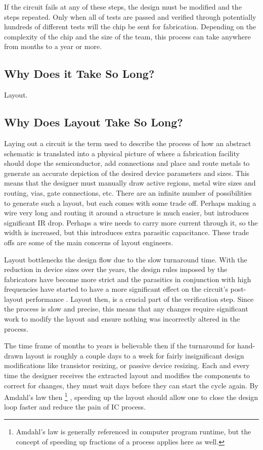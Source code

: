 
If the circuit fails at any of these steps, the design must be modified and the steps repeated. Only when all of tests are passed and verified through potentially hundreds of different tests will the chip be sent for fabrication. Depending on the complexity of the chip and the size of the team, this process can take anywhere from months to a year or more.
\subsection{Why Does it Take So Long?}
Layout.

\subsection{Why Does Layout Take So Long?}
Laying out a circuit is the term used to describe the process of how an abstract schematic is translated into a physical picture of where a fabrication facility should dope the semiconductor, add connections and place and route metals to generate an accurate depiction of the desired device parameters and sizes. This means that the designer must manually draw active regions, metal wire sizes and routing, vias, gate connections, etc. There are an infinite number of possibilities to generate such a layout, but each comes with some trade off. Perhaps making a wire very long and routing it around a structure is much easier, but introduces significant IR drop. Perhaps a wire needs to carry more current through it, so the width is increased, but this introduces extra parasitic capacitance. These trade offs are some of the main concerns of layout engineers. 

Layout bottlenecks the design flow due to the slow turnaround time. With the reduction in device sizes over the years, the design rules imposed by the fabricators have become more strict and the parasitics in conjunction with high frequencies have started to have a more significant effect on the circuit's post-layout performance \cite{allen_practice_2004} \cite{lourenco_layout-aware_2015}. Layout then, is a crucial part of the verification step. Since the process is slow and precise, this means that any changes require significant work to modify the layout and ensure nothing was incorrectly altered in the process.

The time frame of months to years is believable then if the turnaround for hand-drawn layout is roughly a couple days to a week for fairly insignificant design modifications like transistor resizing, or passive device resizing. Each and every time the designer receives the extracted layout and modifies the components to correct for changes, they must wait days before they can start the cycle again. By Amdahl's law then \footnote{Amdahl's law is generally referenced in computer program runtime, but the concept of speeding up fractions of a process applies here as well.} \cite{noauthor_amdahls_nodate}, speeding up the layout should allow one to close the design loop faster and reduce the pain of IC process.
